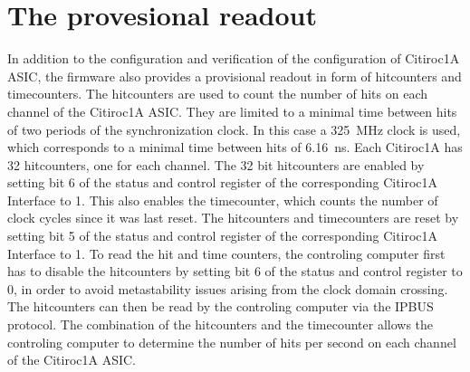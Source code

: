 \section{The provesional readout}
In addition to the configuration and verification of the configuration of Citiroc1A ASIC, the firmware also provides a provisional readout in form of hitcounters and timecounters. 
\newline
The hitcounters are used to count the number of hits on each channel of the Citiroc1A ASIC.
\newline
They are limited to a minimal time between hits of two periods of the synchronization clock.
In this case a \SI{325}{\mega\hertz} clock is used, which corresponds to a minimal time between hits of \SI{6.16}{\nano\second}.
\newline
Each Citiroc1A has 32 hitcounters, one for each channel.
The 32 bit hitcounters are enabled by setting bit 6 of the status and control register of the corresponding Citiroc1A Interface to 1. 
This also enables the timecounter, which counts the number of clock cycles since it was last reset. 
\newline
The hitcounters and timecounters are reset by setting bit 5 of the status and control register of the corresponding Citiroc1A Interface to 1.
\newline
To read the hit and time counters, the controling computer first has to disable the hitcounters by setting bit 6 of the status and control register to 0, in order to avoid metastability issues arising from the clock domain crossing.
The hitcounters can then be read by the controling computer via the IPBUS protocol.
\newline
The combination of the hitcounters and the timecounter allows the controling computer to determine the number of hits per second on each channel of the Citiroc1A ASIC.